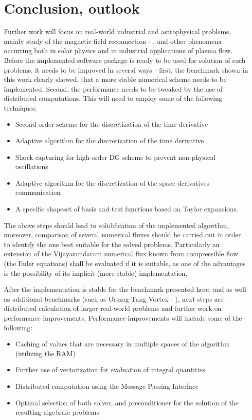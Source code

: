 \chapter{Conclusion, outlook}
Further work will focus on real-world industrial and astrophysical problems, mainly study of the magnetic field reconnection - \citep{reconnection}, and other phenomena occurring both in solar physics and in industrial applications of plasma flow.
Before the implemented software package is ready to be used for solution of such problems, it needs to be improved in several ways - first, the benchmark shown in this work clearly showed, that a more stable numerical scheme needs to be implemented. Second, the performance needs to be tweaked by the use of distributed computations. This will need to employ some of the following techniques:
\begin{itemize}
	\item Second-order scheme for the discretization of the time derivative
	\item Adaptive algorithm for the discretization of the time derivative
	\item Shock-capturing for high-order DG scheme to prevent non-physical oscillations
	\item Adaptive algorithm for the discretization of the space derivatives communication
	\item A specific shapeset of basis and test functions based on Taylor expansions.
\end{itemize}

The above steps should lead to solidification of the implemented algorithm, moreover, comparison of several numerical fluxes should be carried out in order to identify the one best suitable for the solved problems. Particularly an extension of the Vijayasundaram numerical flux known from compressible flow (the Euler equations) shall be evaluated if it is suitable, as one of the advantages is the possibility of its implicit (more stable) implementation.

After the implementation is stable for the benchmark presented here, and as well as additional benchmarks (such as Orszag-Tang Vortex - \citep{vortex}), next steps are distributed calculation of larger real-world problems and further work on performance improvements. Performance improvements will include some of the following:
\begin{itemize}
	\item Caching of values that are necessary in multiple spaces of the algorithm (utilizing the RAM)
	\item Further use of vectorization for evaluation of integral quantities
	\item Distributed computation using the Message Passing Interface
	\item Optimal selection of both solver, and preconditioner for the solution of the resulting algebraic problems
\end{itemize}

